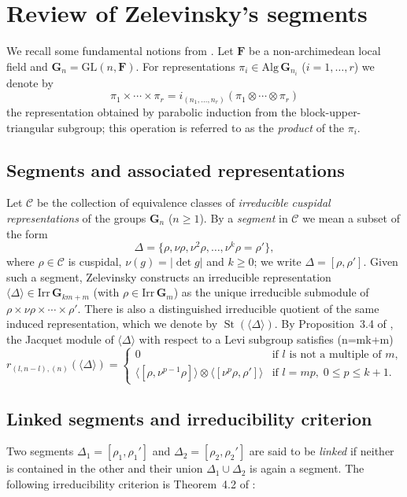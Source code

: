 \documentclass[12pt]{article}
\theoremstyle{remark}
\begin{document}
\section{Review of Zelevinsky's segments}

We recall some fundamental notions from \cite{Zelevinsky1980}. Let $\mathbf{F}$ be a non-archimedean local field and $\mathbf{G}_n = \mathrm{GL}(n,\mathbf{F})$. For representations $\pi_i \in \mathrm{Alg}\,\mathbf{G}_{n_i}$ ($i=1,\dots,r$) we denote by
\[
\pi_1 \times \cdots \times \pi_r = i_{(n_1,\dots,n_r)}(\pi_1 \otimes \cdots \otimes \pi_r)
\]
the representation obtained by parabolic induction from the block-upper-triangular subgroup; this operation is referred to as the \emph{product} of the $\pi_i$.

\subsection{Segments and associated representations}
Let $\mathcal{C}$ be the collection of equivalence classes of \emph{irreducible cuspidal representations} of the groups $\mathbf{G}_n$ ($n\ge 1$). By a \emph{segment} in $\mathcal{C}$ we mean a subset of the form
\[
\Delta = \{\rho,\nu\rho,\nu^2\rho,\dots,\nu^k\rho = \rho'\},
\]
where $\rho\in\mathcal{C}$ is cuspidal, $\nu(g)=|\det g|$ and $k\ge 0$; we write $\Delta = [\rho,\rho']$. Given such a segment, Zelevinsky constructs an irreducible representation $\langle\Delta\rangle\in \mathrm{Irr}\,\mathbf{G}_{km+m}$ (with $\rho\in\mathrm{Irr}\,\mathbf{G}_m$) as the unique irreducible submodule of $\rho\times\nu\rho\times\cdots\times\rho'$. There is also a distinguished irreducible quotient of the same induced representation, which we denote by $\operatorname{St}(\langle\Delta\rangle)$. By Proposition~3.4 of \cite{Zelevinsky1980}, the Jacquet module of $\langle\Delta\rangle$ with respect to a Levi subgroup satisfies (n=mk+m)
\[
r_{(l,n-l),(n)}(\langle\Delta\rangle) = 
\begin{cases}
0 & \text{if } l \text{ is not a multiple of } m,\\
\langle[\rho,\nu^{p-1}\rho]\rangle \otimes \langle[\nu^p\rho,\rho']\rangle & \text{if } l = mp,\; 0\le p\le k+1.
\end{cases}
\]

\subsection{Linked segments and irreducibility criterion}
Two segments $\Delta_1 = [\rho_1,\rho_1']$ and $\Delta_2 = [\rho_2,\rho_2']$ are said to be \emph{linked} if neither is contained in the other and their union $\Delta_1\cup\Delta_2$ is again a segment. The following irreducibility criterion is Theorem~4.2 of \cite{Zelevinsky1980}:
\end{document}
